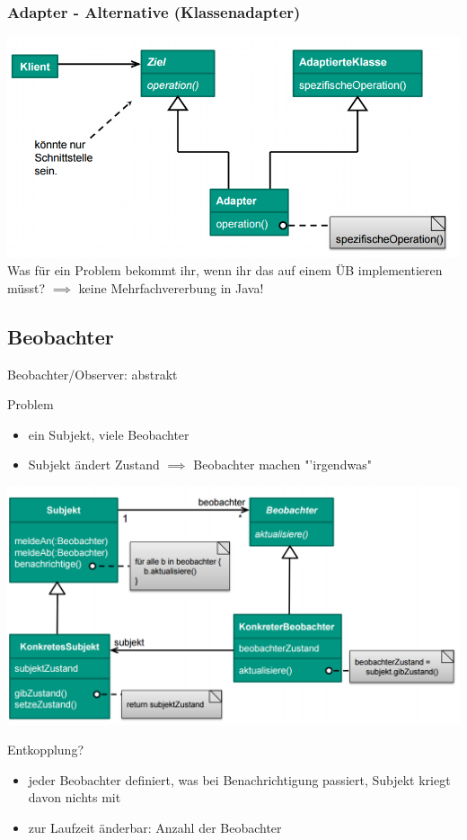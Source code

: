 \documentclass[18pt]{beamer}
\begin{document}
	\begin{frame}
		\frametitle{Adapter - Alternative (Klassenadapter)}
		\includegraphics[scale=0.45]{./pics/tut3/adap-cl.png} \linebreak \pause
		Was für ein Problem bekommt ihr, wenn ihr das auf einem ÜB implementieren müsst? \pause \linebreak
		$\implies$ keine Mehrfachvererbung in Java!
	\end{frame}

	\subsection{Beobachter}
	\begin{frame}{Beobachter/Observer: abstrakt}
		\begin{block}{Problem}
			\begin{itemize}
				\item ein Subjekt, viele Beobachter
				\item Subjekt ändert Zustand $\implies$ Beobachter machen "'irgendwas"
			\end{itemize}		
		\end{block}
	\end{frame}

	\begin{frame}{}
		\includegraphics[keepaspectratio, width=\textwidth, height=\textheight]{pics/tut3/obs.png}
		\pause
		\begin{block}{Entkopplung?}
		\begin{itemize}
			\pause 
			\item jeder Beobachter definiert, was bei Benachrichtigung passiert, Subjekt kriegt davon nichts mit \pause
			\item zur Laufzeit änderbar: Anzahl der Beobachter
		\end{itemize}
		\end{block}
	\end{frame}
\end{document}
